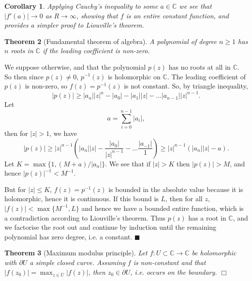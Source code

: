 \documentclass[letter-paper]{tufte-book}
\newtheorem{theorem}{\color{pastel-blue}Theorem}[section]
\newtheorem{corollary}[theorem]{\color{pastel-blue}Corollary}
\newenvironment{proof}[1][Proof]{\begin{trivlist}
\item[\hskip \labelsep {\bfseries #1}]}{\end{trivlist}}
\newcommand{\qed}{\hfill$\blacksquare$}
\newcommand{\qedwhite}{\hfill \ensuremath{\Box}}
\begin{document}
\begin{corollary}
  Applying Cauchy's inequality to some $a\in\mathbb{C}$ we see that $|f'(a)| \to
  0$ as $R\to\infty$, showing that $f$ is an entire constant function, and
  provides a simpler proof to Liouville's theorem.
\end{corollary}

\begin{theorem}[Fundamental theorem of algebra]
  A polynomial of degree $n\geq1$ has $n$ roots in $\mathbb{C}$ if the leading
  coefficient is non-zero.
\end{theorem}

\begin{proof}
  We suppose otherwise, and that the polynomial $p(z)$ has no roots at all in
  $\mathbb{C}$. So then since $p(z) \neq 0$, $p^{-1}(z)$ is holomorphic on
  $\mathbb{C}$. The leading coefficient of $p(z)$ is non-zero, so $f(z) =
  p^{-1}(z)$ is not constant. So, by triangle inequality,
  \begin{equation*}
    |p(z)| \geq |a_n| |z|^n - |a_0| - |a_1||z| - \ldots |a_{n-1}||z|^{n-1}.
  \end{equation*}
  Let
  \begin{equation*}
    a = \sum_{i=0}^{n-1} |a_i|,
  \end{equation*}
  then for $|z| > 1$, we have
  \begin{equation*}
    |p(z)| \geq |z|^{n-1} \left(|a_n||z| - \frac{|a_0|}{|z|^{n-1}} - \ldots \frac{|a_{-1}|}{1}\right) \geq |z|^{n-1}\left(|a_n||z| - a\right).
  \end{equation*}
  Let $K = \max\{1, (M+a)/|a_n|\}$. We see that if $|z| > K$ then $|p(z)| > M$,
  and hence $|p(z)|^{-1} < M^{-1}$. 
  
  But for $|z| \leq K$, $f(z) = p^{-1}(z)$ is bounded in the absolute value
  because it is holomorphic, hence it is continuous. If this bound is $L$, then
  for all $z$, $|f(z)| < \max\{M^{-1}, L\}$ and hence we have a bounded entire
  function, which is a contradiction according to Liouville's theorem. Thus
  $p(z)$ has a root in $\mathbb{C}$, and we factorise the root out and continue
  by induction until the remaining polynomial has zero degree, i.e. a constant. \qed
\end{proof}

\begin{theorem}[Maximum modulus principle]
  Let $f: U \subset \mathbb{C} \to \mathbb{C}$ be holomorphic with $\partial U$
  a simple closed curve. Assuming $f$ is non-constant and that $|f(z_0)| =
  \max_{z\in\overline{U}}|f(z)|$, then $z_0 \in \partial U$, i.e. occurs on the
  boundary. \qedwhite
\end{theorem}
\end{document}
